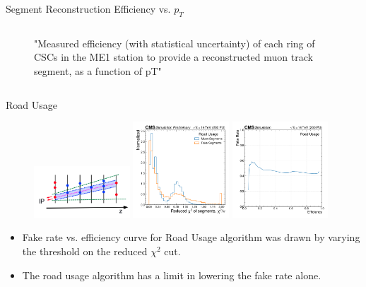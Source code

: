 \documentclass[10pt]{beamer}
\begin{document}
\begin{frame}[fragile]{Segment Reconstruction Efficiency vs. $p_{T}$}
\begin{columns}
\begin{column}{0.5\textwidth}
\begin{figure}
        \caption{{\scriptsize "Measured efficiency (with statistical uncertainty) of each ring of CSCs in the ME1 station to provide a reconstructed muon track segment, as a function of pT"}}
    \end{figure}
\end{column}
\end{columns}
\end{frame}





\begin{frame}[fragile]{Road Usage}

\begin{figure}
    \centering
    \href{https://www.epj-conferences.org/articles/epjconf/pdf/2019/19/epjconf_chep2018_02014.pdf}{\includegraphics[width=0.32\textwidth]{figures/RU/Schematic-illustration.png}}
    \includegraphics[width=0.32\textwidth]{figures/RU/RU_ReducedChi2.pdf}
    \includegraphics[width=0.32\textwidth]{figures/RU/RU_ROC.pdf}
\end{figure}

\begin{itemize}
    \item Fake rate vs. efficiency curve for Road Usage algorithm was drawn by varying the threshold on the reduced $\chi^{2}$ cut.
    \item The road usage algorithm has a limit in lowering the fake rate alone.
\end{itemize}

\end{frame}
\end{document}
